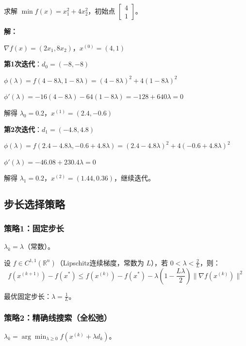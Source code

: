 \begin{example}[最速下降法]
求解 $\min f(x) = x_1^2 + 4x_2^2$，初始点 $\begin{bmatrix} 4 \\ 1 \end{bmatrix}$。

\textbf{解：}

$\nabla f(x) = (2x_1, 8x_2)$，$x^{(0)} = (4, 1)$

\textbf{第1次迭代}：$d_0 = (-8, -8)$

$\phi(\lambda) = f(4-8\lambda, 1-8\lambda) = (4-8\lambda)^2 + 4(1-8\lambda)^2$

$\phi'(\lambda) = -16(4-8\lambda) - 64(1-8\lambda) = -128 + 640\lambda = 0$

解得 $\lambda_0 = 0.2$，$x^{(1)} = (2.4, -0.6)$

\textbf{第2次迭代}：$d_1 = (-4.8, 4.8)$

$\phi(\lambda) = f(2.4-4.8\lambda, -0.6+4.8\lambda) = (2.4-4.8\lambda)^2 + 4(-0.6+4.8\lambda)^2$

$\phi'(\lambda) = -46.08 + 230.4\lambda = 0$

解得 $\lambda_1 = 0.2$，$x^{(2)} = (1.44, 0.36)$，继续迭代。
\end{example}

\subsection{步长选择策略}\label{sec:step-size}

\subsubsection{策略1：固定步长}

$\lambda_k = \lambda$（常数）。

\begin{theorem}[固定步长收敛条件]
设 $f \in C^{1,1}(\mathbb{R}^n)$（Lipschitz连续梯度，常数为 $L$），若 $0 < \lambda < \frac{2}{L}$，则：
\[
f(x^{(k+1)}) - f(x^*) \leq f(x^{(k)}) - f(x^*) - \lambda\left(1 - \frac{L\lambda}{2}\right)\|\nabla f(x^{(k)})\|^2
\]
\end{theorem}

最优固定步长：$\lambda = \frac{1}{L}$。

\subsubsection{策略2：精确线搜索（全松弛）}

$\lambda_k = \arg\min_{\lambda \geq 0} f(x^{(k)} + \lambda d_k)$。

